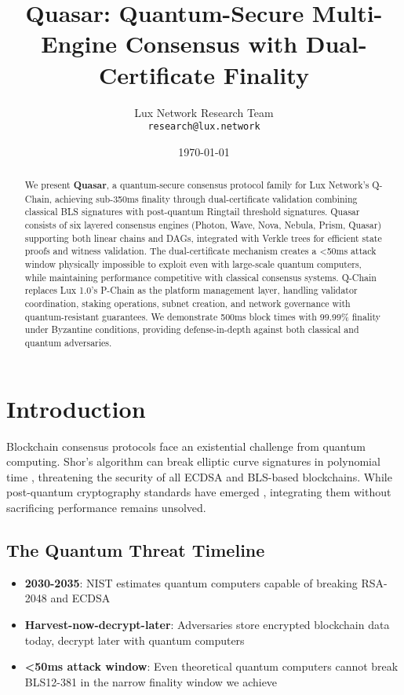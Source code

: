 \documentclass[11pt]{article}
\title{Quasar: Quantum-Secure Multi-Engine Consensus with Dual-Certificate Finality}
\author{
  Lux Network Research Team\\
  \texttt{research@lux.network}
}
\date{\today}
\begin{document}
\maketitle

\begin{abstract}
We present \textbf{Quasar}, a quantum-secure consensus protocol family for Lux Network's Q-Chain, achieving sub-350ms finality through dual-certificate validation combining classical BLS signatures with post-quantum Ringtail threshold signatures. Quasar consists of six layered consensus engines (Photon, Wave, Nova, Nebula, Prism, Quasar) supporting both linear chains and DAGs, integrated with Verkle trees for efficient state proofs and witness validation. The dual-certificate mechanism creates a <50ms attack window physically impossible to exploit even with large-scale quantum computers, while maintaining performance competitive with classical consensus systems. Q-Chain replaces Lux 1.0's P-Chain as the platform management layer, handling validator coordination, staking operations, subnet creation, and network governance with quantum-resistant guarantees. We demonstrate 500ms block times with 99.99\% finality under Byzantine conditions, providing defense-in-depth against both classical and quantum adversaries.
\end{abstract}

\section{Introduction}

Blockchain consensus protocols face an existential challenge from quantum computing. Shor's algorithm can break elliptic curve signatures in polynomial time \cite{shor1994}, threatening the security of all ECDSA and BLS-based blockchains. While post-quantum cryptography standards have emerged \cite{nist-pqc}, integrating them without sacrificing performance remains unsolved.

\subsection{The Quantum Threat Timeline}

\begin{itemize}
\item \textbf{2030-2035}: NIST estimates quantum computers capable of breaking RSA-2048 and ECDSA \cite{mosca2018}
\item \textbf{Harvest-now-decrypt-later}: Adversaries store encrypted blockchain data today, decrypt later with quantum computers
\item \textbf{<50ms attack window}: Even theoretical quantum computers cannot break BLS12-381 in the narrow finality window we achieve
\end{itemize}
\end{document}
